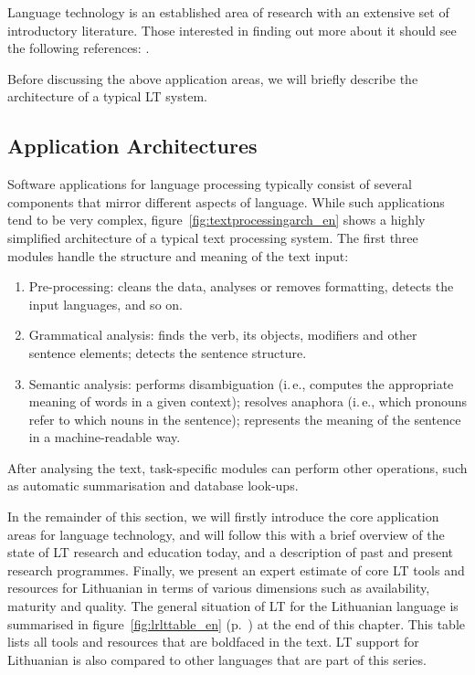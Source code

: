 \begin{multicols}{2}
Language technology is an established area of research with an extensive set of introductory literature. Those interested in finding out more about it should see the following references:  \cite{carstensen-etal1, jurafsky-martin01, manning-schuetze1, lt-world1, lt-survey1}.

Before discussing the above application areas, we will briefly describe the architecture of a typical LT system.

\subsection{Application Architectures}

Software applications for language processing typically consist of several components that mirror different aspects of language. While such applications tend to be very complex, figure~\ref{fig:textprocessingarch_en} shows a highly simplified architecture of a typical text processing system. The first three modules handle the structure and meaning of the text input:

\begin{enumerate}
\item Pre-processing: cleans the data, analyses or removes formatting, detects the input languages, and so on.
\item Grammatical analysis: finds the verb, its objects, modifiers and other sentence elements; detects the sentence structure.
\item Semantic analysis: performs disambiguation (i.\,e., computes the appropriate meaning of words in a given context); resolves anaphora (i.\,e., which pronouns refer to which nouns in the sentence); represents the meaning of the sentence in a machine-readable way.
\end{enumerate}

After analysing the text, task-specific modules can perform other operations, such as automatic summarisation and database look-ups.

In the remainder of this section, we will firstly introduce the core application areas for language technology, and will follow this with a brief overview of the state of LT research and education today, and a description of past and present research programmes. Finally, we present an expert estimate of core LT tools and resources for Lithuanian in terms of various dimensions such as availability, maturity and quality. The general situation of LT for the Lithuanian language is summarised in figure~\ref{fig:lrlttable_en} (p.~\pageref{fig:lrlttable_en}) at the end of this chapter. This table lists all tools and resources that are boldfaced in the text. LT support for Lithuanian is also compared to other languages that are part of this series.


\end{multicols}
